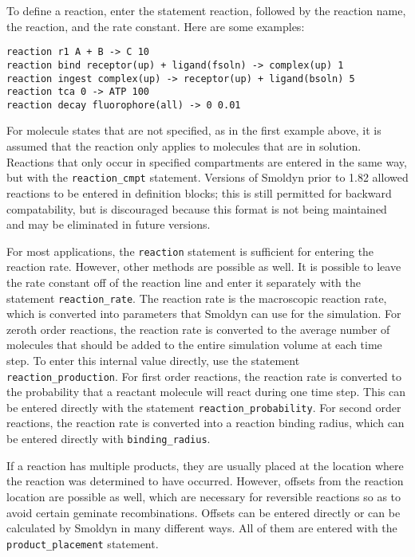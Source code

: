 \documentclass {scrbook}
\newcommand {\ttt} {\texttt}
\begin{document}
To define a reaction, enter the statement reaction, followed by the reaction name, the reaction, and the rate constant. Here are some examples:

\begin{lstlisting}[style=SSAC]
reaction r1 A + B -> C 10
reaction bind receptor(up) + ligand(fsoln) -> complex(up) 1
reaction ingest complex(up) -> receptor(up) + ligand(bsoln) 5
reaction tca 0 -> ATP 100
reaction decay fluorophore(all) -> 0 0.01
\end{lstlisting}

For molecule states that are not specified, as in the first example above, it is assumed that the reaction only applies to molecules that are in solution. Reactions that only occur in specified compartments are entered in the same way, but with the \ttt{reaction\_cmpt} statement. Versions of Smoldyn prior to 1.82 allowed reactions to be entered in definition blocks; this is still permitted for backward compatability, but is discouraged because this format is not being maintained and may be eliminated in future versions.

For most applications, the \ttt{reaction} statement is sufficient for entering the reaction rate. However, other methods are possible as well. It is possible to leave the rate constant off of the reaction line and enter it separately with the statement \ttt{reaction\_rate}. The reaction rate is the macroscopic reaction rate, which is converted into parameters that Smoldyn can use for the simulation. For zeroth order reactions, the reaction rate is converted to the average number of molecules that should be added to the entire simulation volume at each time step. To enter this internal value directly, use the statement \ttt{reaction\_production}. For first order reactions, the reaction rate is converted to the probability that a reactant molecule will react during one time step. This can be entered directly with the statement \ttt{reaction\_probability}. For second order reactions, the reaction rate is converted into a reaction binding radius, which can be entered directly with \ttt{binding\_radius}.

If a reaction has multiple products, they are usually placed at the location where the reaction was determined to have occurred. However, offsets from the reaction location are possible as well, which are necessary for reversible reactions so as to avoid certain geminate recombinations. Offsets can be entered directly or can be calculated by Smoldyn in many different ways. All of them are entered with the \ttt{product\_placement} statement.
\end{document}

